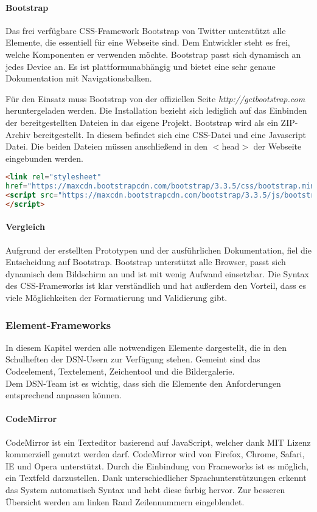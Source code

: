 \paragraph{Bootstrap}
Das frei verfügbare CSS-Framework Bootstrap von Twitter unterstützt alle Elemente, die essentiell für eine Webseite sind. Dem Entwickler steht es frei, welche Komponenten er verwenden möchte. Bootstrap passt sich dynamisch an jedes Device an. Es ist plattformunabhängig und bietet eine sehr genaue Dokumentation mit Navigationsbalken.

Für den Einsatz muss Bootstrap von der offiziellen Seite \textit{http://getbootstrap.com} heruntergeladen werden. Die Installation bezieht sich lediglich auf das Einbinden der bereitgestellten Dateien in das eigene Projekt. Bootstrap wird als ein ZIP-Archiv bereitgestellt. In diesem befindet sich eine CSS-Datei und eine Javascript Datei. Die beiden Dateien müssen anschließend in den $<$head$>$ der Webseite eingebunden werden. \cite{BOOTSTRAP}
\begin{lstlisting}[caption={Bootstrap einbinden \cite{BOOTSTRAP}}, language=HTML]
<link rel="stylesheet"
href="https://maxcdn.bootstrapcdn.com/bootstrap/3.3.5/css/bootstrap.min.css">
<script src="https://maxcdn.bootstrapcdn.com/bootstrap/3.3.5/js/bootstrap.min.js">
</script>
\end{lstlisting}

\paragraph{Vergleich}
Aufgrund der erstellten Prototypen und der ausführlichen Dokumentation, fiel die Entscheidung auf Bootstrap. Bootstrap unterstützt alle Browser, passt sich dynamisch dem Bildschirm an und ist mit wenig Aufwand einsetzbar. Die Syntax des CSS-Frameworks ist klar verständlich und hat außerdem den Vorteil, dass es viele Möglichkeiten der Formatierung und Validierung gibt.

\subsubsection{Element-Frameworks}
In diesem Kapitel werden alle notwendigen Elemente dargestellt, die in den Schulheften der DSN-Usern zur Verfügung stehen. Gemeint sind das Codeelement, Textelement, Zeichentool und die Bildergalerie.\\
Dem DSN-Team ist es wichtig, dass sich die Elemente den Anforderungen entsprechend anpassen können.

\paragraph{CodeMirror}
CodeMirror ist ein Texteditor basierend auf JavaScript, welcher dank MIT Lizenz kommerziell genutzt werden darf. CodeMirror wird von Firefox, Chrome, Safari, IE und Opera unterstützt. Durch die Einbindung von Frameworks ist es möglich, ein Textfeld darzustellen. Dank unterschiedlicher Sprachunterstützungen erkennt das System automatisch Syntax und hebt diese farbig hervor. Zur besseren Übersicht werden am linken Rand Zeilennummern eingeblendet. \cite{CODEMIRROR}

